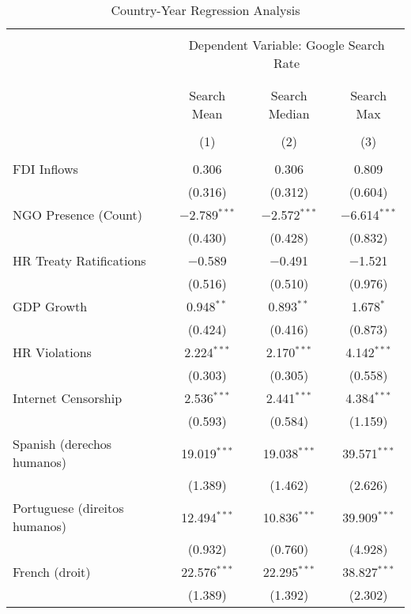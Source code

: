 
\begin{table}[!htbp] \centering 
  \caption{Country-Year Regression Analysis} 
  \label{} 
\begin{tabular}{@{\extracolsep{5pt}}lccc} 
\\[-1.8ex]\hline 
\hline \\[-1.8ex] 
 & \multicolumn{3}{c}{Dependent Variable: Google Search Rate} \\ 
\cline{2-4} 
\\[-1.8ex] & \multicolumn{3}{c}{ } \\ 
 & Search Mean & Search Median & Search Max \\ 
\\[-1.8ex] & (1) & (2) & (3)\\ 
\hline \\[-1.8ex] 
 FDI Inflows & 0.306 & 0.306 & 0.809 \\ 
  & (0.316) & (0.312) & (0.604) \\ 
  NGO Presence (Count) & $-$2.789$^{***}$ & $-$2.572$^{***}$ & $-$6.614$^{***}$ \\ 
  & (0.430) & (0.428) & (0.832) \\ 
  HR Treaty Ratifications & $-$0.589 & $-$0.491 & $-$1.521 \\ 
  & (0.516) & (0.510) & (0.976) \\ 
  GDP Growth & 0.948$^{**}$ & 0.893$^{**}$ & 1.678$^{*}$ \\ 
  & (0.424) & (0.416) & (0.873) \\ 
  HR Violations & 2.224$^{***}$ & 2.170$^{***}$ & 4.142$^{***}$ \\ 
  & (0.303) & (0.305) & (0.558) \\ 
  Internet Censorship & 2.536$^{***}$ & 2.441$^{***}$ & 4.384$^{***}$ \\ 
  & (0.593) & (0.584) & (1.159) \\ 
  Spanish (derechos humanos) & 19.019$^{***}$ & 19.038$^{***}$ & 39.571$^{***}$ \\ 
  & (1.389) & (1.462) & (2.626) \\ 
  Portuguese (direitos humanos) & 12.494$^{***}$ & 10.836$^{***}$ & 39.909$^{***}$ \\ 
  & (0.932) & (0.760) & (4.928) \\ 
  French (droit) & 22.576$^{***}$ & 22.295$^{***}$ & 38.827$^{***}$ \\ 
  & (1.389) & (1.392) & (2.302) \\ 

\end{tabular}
\end{table}
